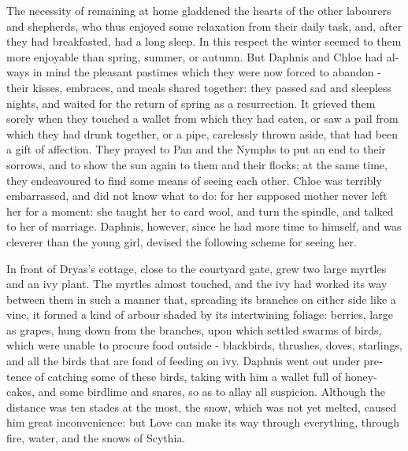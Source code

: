 \documentclass{book}
\begin{document}
\begin{pairs}
\begin{Rightside}
\begin{english}
  The necessity of remaining at home gladdened the hearts of the other labourers and shepherds, who thus enjoyed some relaxation from their daily task, and, after they had breakfasted, had a long sleep.  In this respect the winter seemed to them more enjoyable than spring, summer, or autumn.  But Daphnis and Chloe had always in mind the pleasant pastimes which they were now forced to abandon - their kisses, embraces, and meals shared together: they passed sad and sleepless nights, and waited for the return of spring as a resurrection.  It grieved them sorely when they touched a wallet from which they had eaten, or saw a pail from which they had drunk together, or a pipe, carelessly thrown aside, that had been a gift of affection.  They prayed to Pan and the Nymphs to put an end to their sorrows, and to show the sun again to them and their flocks; at the same time, they endeavoured to find some means of seeing each other.  Chloe was terribly embarrassed, and did not know what to do: for her supposed mother never left her for a moment: she taught her to card wool, and turn the spindle, and talked to her of marriage.  Daphnis, however, since he had more time to himself, and was cleverer than the young girl, devised the following scheme for seeing her.
\pend


  In front of Dryas's cottage, close to the courtyard gate, grew two large myrtles and an ivy plant.  The myrtles almost touched, and the ivy had worked its way between them in such a manner that, spreading its branches on either side like a vine, it formed a kind of arbour shaded by its intertwining foliage: berries, large as grapes, hung down from the branches, upon which settled swarms of birds, which were unable to procure food outside - blackbirds, thrushes, doves, starlings, and all the birds that are fond of feeding on ivy.  Daphnis went out under pretence of catching some of these birds, taking with him a wallet full of honey-cakes, and some birdlime and snares, so as to allay all suspicion.  Although the distance was ten stades at the most, the snow, which was not yet melted, caused him great inconvenience: but Love can make its way through everything, through fire, water, and the snows of Scythia.
\pend



\end{english}
\end{Rightside}
\end{pairs}
\end{document}

